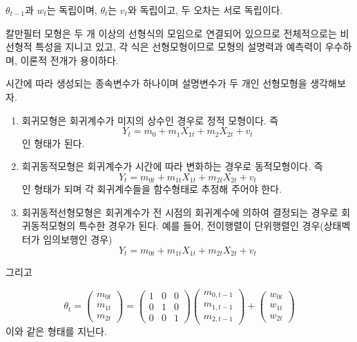 \documentclass[b5paper,]{scrbook}
\theoremstyle{plain}
\theoremstyle{definition}
\numberwithin{equation}{section}
\let\BeginKnitrBlock\begin \let\EndKnitrBlock\end
\begin{document}
\(\theta_{t-1}\)과 \(w_{t}\)는 독립이며, \(\theta_{t}\)는 \(v_{t}\)와 독립이고, 두 오차는 서로 독립이다.

칼만필터 모형은 두 개 이상의 선형식의 모임으로 연결되어 있으므로 전체적으로는 비선형적 특성을 지니고 있고, 각 식은 선형모형이므로 모형의 설명력과 예측력이 우수하며, 이론적 전개가 용이하다.

\BeginKnitrBlock{example}[칼만필터 모형의 예]
\protect\hypertarget{exm:unnamed-chunk-229}{}{\label{exm:unnamed-chunk-229} {} }시간에 따라 생성되는 종속변수가 하나이며 설명변수가 두 개인 선형모형을 생각해보자.

\begin{enumerate}
\def\labelenumi{\arabic{enumi}.}
\item
  회귀모형은 회귀계수가 미지의 상수인 경우로 정적 모형이다. 즉
  \[Y_{t}=m_{0}+m_{1}X_{1t}+m_{2}X_{2t}+v_{t}\]
  인 형태가 된다.
\item
  회귀동적모형은 회귀계수가 시간에 따라 변화하는 경우로 동적모형이다. 즉
  \[Y_{t}=m_{0t}+m_{1t}X_{1t}+m_{2t}X_{2t}+v_{t}\]
  인 형태가 되며 각 회귀계수들을 함수형태로 추정해 주어야 한다.
\item
  회귀동적선형모형은 회귀계수가 전 시점의 회귀계수에 의하여 결정되는 경우로 회귀동적모형의 특수한 경우가 된다. 예를 들어, 전이행렬이 단위행렬인 경우(상태벡터가 임의보행인 경우)
  \[Y_{t}=m_{0t}+m_{1t}X_{1t}+m_{2t}X_{2t}+v_{t}\]
\end{enumerate}

그리고

\[
\theta_{t} =
 \begin{pmatrix}
  m_{0t} \\
  m_{1t} \\
  m_{2t} 
 \end{pmatrix}
= 
 \begin{pmatrix}
  1 & 0 & 0 \\
  0 & 1 & 0 \\
  0 & 0 & 1
 \end{pmatrix}
 \begin{pmatrix}
  m_{0,t-1} \\
  m_{1,t-1} \\
  m_{2,t-1} 
 \end{pmatrix} 
+
 \begin{pmatrix}
  w_{0t} \\
  w_{1t} \\
  w_{2t} 
 \end{pmatrix}
\]
이와 같은 형태를 지닌다.
\EndKnitrBlock{example}
\end{document}
